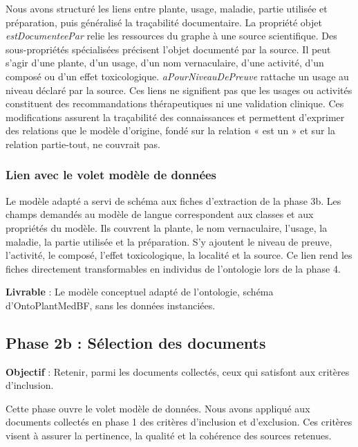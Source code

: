 Nous avons structuré les liens entre plante, usage, maladie, partie utilisée et préparation, puis généralisé la traçabilité documentaire. La propriété objet \textit{estDocumenteePar} relie les ressources du graphe à une source scientifique. Des sous-propriétés spécialisées précisent l'objet documenté par la source. Il peut s'agir d'une plante, d'un usage, d'un nom vernaculaire, d'une activité, d'un composé ou d'un effet toxicologique. \textit{aPourNiveauDePreuve} rattache un usage au niveau déclaré par la source. Ces liens ne signifient pas que les usages ou activités constituent des recommandations thérapeutiques ni une validation clinique. Ces modifications assurent la traçabilité des connaissances et permettent d'exprimer des relations que le modèle d'origine, fondé sur la relation « est un » et sur la relation partie-tout, ne couvrait pas.

\subsubsection{Lien avec le volet modèle de données}

Le modèle adapté a servi de schéma aux fiches d'extraction de la phase 3b. Les champs demandés au modèle de langue correspondent aux classes et aux propriétés du modèle. Ils couvrent la plante, le nom vernaculaire, l'usage, la maladie, la partie utilisée et la préparation. S'y ajoutent le niveau de preuve, l'activité, le composé, l'effet toxicologique, la localité et la source. Ce lien rend les fiches directement transformables en individus de l'ontologie lors de la phase 4.

\textbf{Livrable} : Le modèle conceptuel adapté de l'ontologie, schéma d'OntoPlantMedBF, sans les données instanciées.


\subsection{Phase 2b : Sélection des documents}
\label{subsec:phase2b}

\textbf{Objectif} : Retenir, parmi les documents collectés, ceux qui satisfont aux critères d'inclusion.

Cette phase ouvre le volet modèle de données. Nous avons appliqué aux documents collectés en phase 1 des critères d'inclusion et d'exclusion. Ces critères visent à assurer la pertinence, la qualité et la cohérence des sources retenues.

